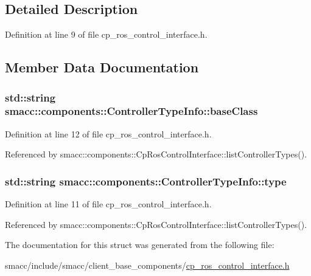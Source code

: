 \subsection{Detailed Description}


Definition at line 9 of file cp\+\_\+ros\+\_\+control\+\_\+interface.\+h.



\subsection{Member Data Documentation}
\subsubsection[{\texorpdfstring{base\+Class}{baseClass}}]{\setlength{\rightskip}{0pt plus 5cm}std\+::string smacc\+::components\+::\+Controller\+Type\+Info\+::base\+Class}\hypertarget{structsmacc_1_1components_1_1ControllerTypeInfo_a4506855fc728c39046bdb4f98a6a61f3}{}\label{structsmacc_1_1components_1_1ControllerTypeInfo_a4506855fc728c39046bdb4f98a6a61f3}


Definition at line 12 of file cp\+\_\+ros\+\_\+control\+\_\+interface.\+h.



Referenced by smacc\+::components\+::\+Cp\+Ros\+Control\+Interface\+::list\+Controller\+Types().

\subsubsection[{\texorpdfstring{type}{type}}]{\setlength{\rightskip}{0pt plus 5cm}std\+::string smacc\+::components\+::\+Controller\+Type\+Info\+::type}\hypertarget{structsmacc_1_1components_1_1ControllerTypeInfo_a8b66de0e92b5b6b913d6b802a0495637}{}\label{structsmacc_1_1components_1_1ControllerTypeInfo_a8b66de0e92b5b6b913d6b802a0495637}


Definition at line 11 of file cp\+\_\+ros\+\_\+control\+\_\+interface.\+h.



Referenced by smacc\+::components\+::\+Cp\+Ros\+Control\+Interface\+::list\+Controller\+Types().



The documentation for this struct was generated from the following file\+:\begin{DoxyCompactItemize}
\item 
smacc/include/smacc/client\+\_\+base\+\_\+components/\hyperlink{cp__ros__control__interface_8h}{cp\+\_\+ros\+\_\+control\+\_\+interface.\+h}\end{DoxyCompactItemize}
